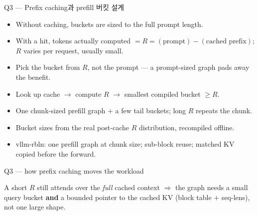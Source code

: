 \begin{frame}{Q3 — Prefix caching과 prefill 버킷 설계}
  \begin{itemize}
    \item Without caching, buckets are sized to the full prompt length.
    \item With a hit, tokens actually computed $= R = (\text{prompt}) - (\text{cached prefix})$;
          $R$ varies per request, usually small.
    \item Pick the bucket from $R$, not the prompt — a prompt-sized graph pads away the benefit.
  \end{itemize}
  \begin{itemize}
    \item Look up cache $\to$ compute $R$ $\to$ smallest compiled bucket $\ge R$.
    \item One chunk-sized prefill graph $+$ a few tail buckets; long $R$ repeats the chunk.
    \item Bucket sizes from the real post-cache $R$ distribution, recompiled offline.
    \item vllm-rbln: one prefill graph at chunk size; sub-block reuse; matched KV copied before the forward.
  \end{itemize}
\end{frame}

\begin{frame}{Q3 — how prefix caching moves the workload}
  \vspace{1.2em}
  \begin{center}\resizebox{\textwidth}{!}{}\end{center}
  \vspace{1.6em}
  \footnotesize A short $R$ still attends over the \emph{full} cached context
  $\Rightarrow$ the graph needs a small query bucket \textbf{and} a bounded pointer to the
  cached KV (block table $+$ seq-lens), not one large shape.
\end{frame}
